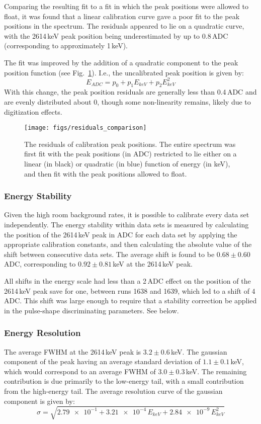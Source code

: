 \documentclass[groupedaddress,rmp,amsmath,amssymb,bibnotes,altaffilletter,twocolumn]{revtex4-1}
\begin{document}
Comparing the resulting fit to a fit in which the peak positions were allowed to float, it was found that a linear calibration curve gave a poor fit to the peak positions in the spectrum. The residuals appeared to lie on a quadratic curve, with the 2614\,keV peak position being underestimated by up to 0.8\,ADC (corresponding to approximately 1\,keV). 

The fit was improved by the addition of a quadratic component to the peak position function (see Fig.~\ref{fig:calib_residuals}). I.e., the uncalibrated peak position is given by:
$$E_{ADC} = p_0 + p_1E_{keV} + p_2E_{keV}^2$$
With this change, the peak position residuals are generally less than 0.4\,ADC and are evenly distributed about 0, though some non-linearity remains, likely due to digitization effects. 

\begin{figure}[]
 \centering
 \texttt{[image: figs/residuals\_comparison]}
 \caption{The residuals of calibration peak positions. The entire spectrum was first fit with the peak positions (in ADC) restricted to lie either on a linear (in black) or quadratic (in blue) function of energy (in keV), and then fit with the peak positions allowed to float.} 
 \label{fig:calib_residuals}
\end{figure}
\subsubsection{Energy Stability}
Given the high room background rates, it is possible to calibrate every data set independently. The energy stability within data sets is measured by calculating the position of the 2614\,keV peak in ADC for each data set by applying the appropriate calibration constants, and then calculating the absolute value of the shift between consecutive data sets. The average shift is found to be $0.68\pm0.60$\,ADC, corresponding to $0.92\pm0.81$\,keV at the 2614\,keV peak. 

All shifts in the energy scale had less than a 2\,ADC effect on the position of the 2614\,keV peak save for one, between runs 1638 and 1639, which led to a shift of 4\,ADC. This shift was large enough to require that a stability correction be applied in the pulse-shape discriminating parameters. See below. 

\subsubsection{Energy Resolution}
The average FWHM at the 2614\,keV peak is $3.2\pm0.6$\,keV. The gaussian component of the peak having an average standard deviation of $1.1\pm0.1$\,keV, which would correspond to an average FWHM of $3.0\pm0.3$\,keV. The remaining contribution is due primarily to the low-energy tail, with a small contribution from the high-energy tail. The average resolution curve of the gaussian component is given by:
$$\sigma = \sqrt{\num{2.79e-1}+\num{3.21e-4}\,E_{keV}+\num{2.84e-9}\,E_{keV}^2}$$
\end{document}
